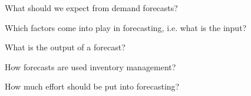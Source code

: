 \begin{exercise}
What should we expect from demand forecasts?

\end{exercise}

\begin{exercise}
Which factors come into play in forecasting, i.e. what is the input?

\end{exercise}

\begin{exercise}
What is the output of a forecast?

\end{exercise}

\begin{exercise}
How forecasts are used inventory management?

\end{exercise}

\begin{exercise}
How much effort should be put into forecasting?

\end{exercise}

